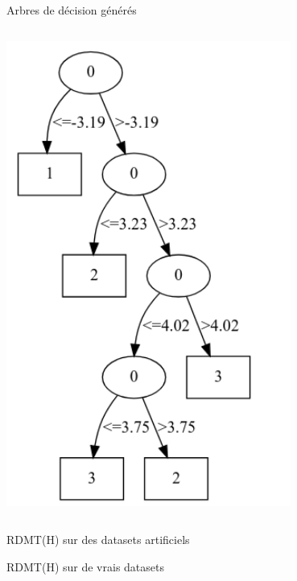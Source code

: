 \documentclass[usenames,dvipsnames]{beamer}
\begin{document}
\begin{frame}{Arbres de décision générés}
\begin{columns}
\begin{column}{0.5\textwidth}
	    \includegraphics[width=0.7\textwidth]{sdm-tree-artificial.png}
        \end{column}
    \end{columns}
\end{frame}

\begin{frame}{RDMT(H) sur des datasets artificiels}

\end{frame}

\begin{frame}{RDMT(H) sur de vrais datasets}

\end{frame}

\begin{frame}[allowframebreaks]
  \printbibliography
\end{frame}
\end{document}
